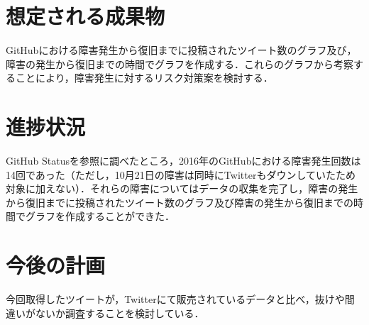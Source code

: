 \documentclass[uplatex,twocolumn,dvipdfmx]{jsarticle}
\begin{document}
\section{想定される成果物}
GitHubにおける障害発生から復旧までに投稿されたツイート数のグラフ及び，障害の発生から復旧までの時間でグラフを作成する．これらのグラフから考察することにより，障害発生に対するリスク対策案を検討する．
\section{進捗状況}
GitHub Statusを参照に調べたところ，2016年のGitHubにおける障害発生回数は14回であった（ただし，10月21日の障害は同時にTwitterもダウンしていたため対象に加えない）．それらの障害についてはデータの収集を完了し，障害の発生から復旧までに投稿されたツイート数のグラフ及び障害の発生から復旧までの時間でグラフを作成することができた．
\section{今後の計画}
今回取得したツイートが，Twitterにて販売されているデータと比べ，抜けや間違いがないか調査することを検討している．

\end{document}
